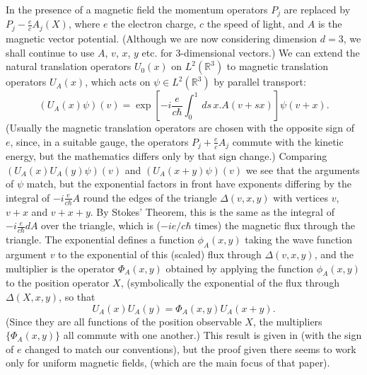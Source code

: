 \documentclass[11pt]{article}
\newcommand{\real}{{\mathbb R}}
\begin{document}
In the presence of a magnetic field the momentum operators $P_j$ are replaced by $P_j-\frac{e}{c}A_j(X)$, where $e$ the electron charge, $c$ the speed of light, and $A$ is the magnetic vector potential. (Although we are now considering dimension $d=3$, we shall continue to use  $A$, $v$, $x$, $y$ etc. for 3-dimensional vectors.)
We can extend the natural translation operators $U_0(x)$ on $L^2(\real^3)$ to  magnetic translation operators $U_A(x)$, which acts on $\psi \in L^2(\real^3)$ by parallel transport:
$$
(U_A(x)\psi)(v) = \exp\left[-i\frac {e}{c\hbar}\int_0^1\, ds \, x.A(v + sx)\right] \psi( v + x).
$$
(Usually the magnetic translation operators are chosen with the opposite sign of $e$, since, in a suitable gauge,  the operators $P_j+\frac ec A_j$ commute with the kinetic energy, but the mathematics differs only by that sign change.) 
Comparing $(U_A(x)U_A(y)\psi)(v)$ and $(U_A(x+ y)\psi)(v)$ we see that the arguments of $\psi$ match, but the exponential factors in front have exponents differing  by the integral of $-i\frac {e}{c\hbar}A$ round the edges of the triangle $\Delta(v,x,y)$ with vertices $v$, $v + x$ and $v + x + y$. By Stokes' Theorem, this is the same as the integral of $-i\frac {e}{c\hbar}{dA}$ over the triangle, which is ($-ie/c\hbar$ times) the magnetic flux through the triangle.
The exponential defines a function $\phi_A(x,y)$ taking the wave function argument $v$  to the exponential of this (scaled) flux through 
$\Delta(v, x, y)$,  and the multiplier is the operator $\Phi_A(x,y)$ obtained by applying the function $\phi_A(x,y)$ to the position operator $X$, (symbolically the exponential of the flux through $\Delta(X,x,y)$, so that
$$
U_A(x)U_A(y) = \Phi_A(x,y)U_A(x+y).
$$
(Since they are all functions of the position observable $X$, the multipliers $\{\Phi_A(x,y)\}$ all commute with one another.) 
This result is given in \cite[Eq. (9)]{Z64}  (with the sign of $e$ changed to match our conventions), but the proof given there seems to work only for uniform magnetic fields, (which are the main focus of that paper). 
\end{document}
